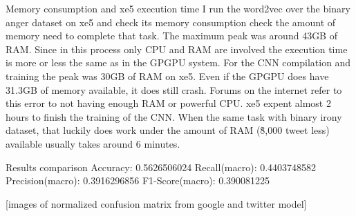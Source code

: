 Memory consumption and xe5 execution time
I run the word2vec over the binary anger dataset on xe5 and check its memory consumption check the amount of memory need to complete that task. The maximum peak was around 43GB of RAM. Since in this process only CPU and RAM are involved the execution time is more or less the same as in the GPGPU system.
For the CNN compilation and training the peak was 30GB of RAM on xe5. Even if the GPGPU does have 31.3GB of memory available, it does still crash. Forums on the internet refer to this error to not having enough RAM or powerful CPU. xe5 expent almost 2 hours to finish the training of the CNN. When the same task with binary irony dataset, that luckily does work under the amount of RAM (\~8,000 tweet less) available usually takes around 6 minutes.

Results comparison
Accuracy: 0.5626506024
Recall(macro): 0.4403748582
Precision(macro): 0.3916296856
F1-Score(macro): 0.390081225

[images of normalized confusion matrix from google and twitter model]

\fi